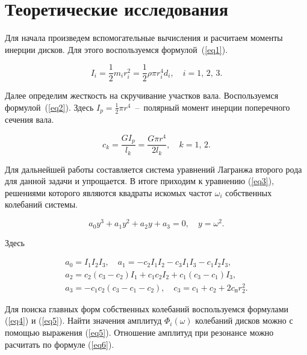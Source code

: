 \documentclass[12pt, a4paper]{article}
\begin{document}
    \section{Теоретические исследования}
    
    Для начала произведем вспомогательные вычисления и расчитаем моменты инерции дисков. Для этого воспользуемся формулой~(\ref{eq1}).
    
    \begin{equation}
        I_{i} = \frac{1}{2} m_{i} r_{i}^{2} = \frac{1}{2} \rho \pi r_{i}^{4} d_{i}, \quad
        i = 1, \, 2, \, 3.
        \label{eq1}
    \end{equation}
    
    Далее определим жесткость на скручивание участков вала. Воспользуемся формулой~(\ref{eq2}). Здесь $I_{p} = \frac{1}{2} \pi r^{4}$~--~полярный момент инерции поперечного сечения вала.
    
    \begin{equation}
        c_{k} = \frac{G I_{p}}{l_{k}} = \frac{G \pi r^{4}}{2 l_{k}}, \quad
        k = 1, \, 2.
        \label{eq2}
    \end{equation}
    
    Для дальнейшей работы составляется система уравнений Лагранжа второго рода для данной задачи и упрощается. В итоге приходим к уравнению (\ref{eq3}), решениями которого являются квадраты искомых частот $\omega_{i}$ собственных колебаний системы.
    
    \begin{equation}
        a_{0}y^{3} + a_{1}y^{2} + a_{2}y + a_{3} = 0, \quad
        y = \omega^{2}.
        \label{eq3}
    \end{equation}
    
    Здесь
    
    \begin{gather*}
        a_{0} = I_{1} I_{2} I_{3}, \quad
        a_{1} = -c_{2} I_{1} I_{2} - c_{3} I_{1} I_{3} - c_{1} I_{2} I_{3}, \\
        a_{2} = c_{2} (c_{3} - c_{2}) I_{1} + c_{1} c_{2} I_{2} + c_{1} (c_{3} - c_{1}) I_{3}, \\
        a_{3} = -c_{1} c_{2} (c_{3} - c_{1} - c_{2}), \quad
        c_{3} = c_{1} + c_{2} + 2 c_{\text{п}} r_{2}^{2}.
    \end{gather*}
    
    Для поиска главных форм собственных колебаний воспользуемся формулами (\ref{eq4}) и (\ref{eq5}). Найти значения амплитуд $\Phi_{i}(\omega)$ колебаний дисков можно с помощью выражения (\ref{eq5}). Отношение амплитуд при резонансе можно расчитать по формуле (\ref{eq6}).
    
\end{document}
